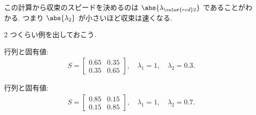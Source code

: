 \documentclass[openany, a4paper, oneside]{jsbook}
\begin{document}
\begin{rem}
この計算から収束のスピードを決めるのは $\abs{\lambda_{\color{red}2}}$ であることがわかる.
つまり $\abs{\lambda_2}$ が小さいほど収束は速くなる.
\end{rem}
2 つくらい例を出しておこう.
\begin{ex}
行列と固有値:
\begin{align}
 S
 =
 \begin{bmatrix}
     0.65 & 0.35 \\
     0.35 & 0.65
 \end{bmatrix}
 , \quad
 \lambda_1
 =
 1, \quad
 \lambda_2
 =
 0.3.
\end{align}
\end{ex}
\begin{ex}
行列と固有値:
\begin{align}
 S
 =
 \begin{bmatrix}
     0.85 & 0.15 \\
     0.15 & 0.85
 \end{bmatrix}
 , \quad
 \lambda_1
 =
 1, \quad
 \lambda_2
 =
 0.7.
\end{align}
\end{ex}
\end{document}

